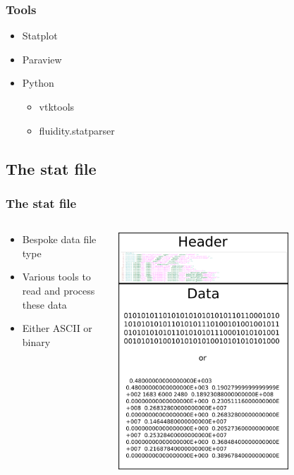 \documentclass[12pt]{beamer}
\begin{document}
\begin{frame}
    \frametitle{Tools}
\begin{itemize}
\item Statplot
\item Paraview
\item Python
    \begin{itemize}
    \item vtktools
    \item fluidity.statparser
    \end{itemize}
\end{itemize}
\end{frame}

\subsection{The stat file}

\begin{frame}
    \frametitle{The stat file}
\begin{columns}
\begin{column}{0.6\textwidth}
\begin{itemize}
\item Bespoke data file type
\item Various tools to read and process these data
\item Either ASCII or binary
\end{itemize}
\end{column}
\begin{column}{0.4\textwidth}
\begin{center}
\includegraphics[width=0.7\textwidth]{images/stat_file.png}
\end{center}
\end{column}
\end{columns}
\end{frame}
\end{document}
